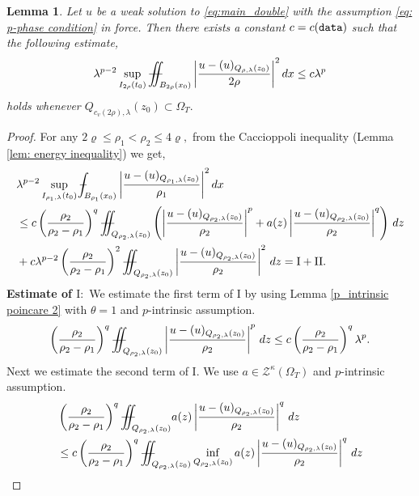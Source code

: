 \documentclass[notitlepage,11pt,reqno]{amsart}
\newtheorem{lemma}[theorem]{Lemma}
\theoremstyle{definition}
\numberwithin{equation}{section}
\newcommand{\la}{\lambda}
\newcommand{\iintss}{{\int\hspace{-0.28cm}\int}}
\newcommand{ \miints }{{\iintss\hspace{-0.56cm} -\hspace{-0.15cm}-}}
\newcommand{\miint}[1]{{\miints_{\hspace{-0.13cm}#1}}}
\def\Xint#1{\mathchoice
	{\XXint\displaystyle\textstyle{#1}}%
	{\XXint\textstyle\scriptstyle{#1}}%
	{\XXint\scriptstyle\scriptscriptstyle{#1}}%
	{\XXint\scriptscriptstyle\scriptscriptstyle{#1}}%
	\!\int}
\def\XXint#1#2#3{{\setbox0=\hbox{$#1{#2#3}{\int}$}
		\vcenter{\hbox{$#2#3$}}\kern-.50\wd0}}
\def\Xint#1{\mathchoice
	{\XXint\displaystyle\textstyle{#1}}%
	{\XXint\textstyle\scriptstyle{#1}}%
	{\XXint\scriptstyle\scriptscriptstyle{#1}}%
	{\XXint\scriptscriptstyle\scriptscriptstyle{#1}}%
	\!\int}
\def\XXint#1#2#3{{\setbox0=\hbox{$#1{#2#3}{\int}$}
		\vcenter{\hbox{$#2#3$}}\kern-.50\wd0}}
\def\dashint{\Xint-}
\begin{document}
\begin{lemma}\label{LEMMA7.5}
Let $u$ be a weak solution to \eqref{eq:main_double} with the assumption \ref{eq: p-phase condition} in force. Then there exists a constant $c=c(\textnormal{\texttt{data}})$ such that the following estimate,
\begin{align*}
\lambda^{p-2} \sup_{I_{2\rho}(t_0)}\miint{B_{2\rho}(x_0)}\left|\frac{u-(u)_{Q_{\rho, \lambda}(z_0)}}{2\rho}\right|^2 dx \leq c \lambda^p
\end{align*}
holds whenever $Q_{c_v(2\rho), \lambda}(z_0)\subset \Omega_T.$
\end{lemma}
\begin{proof}   
For any $2\varrho \leq \rho_1< \rho_2 \leq 4\varrho,$ from the Caccioppoli inequality (Lemma \ref{lem: energy inequality}) we get,
\begin{align*}
    &\la^{p-2}\sup_{I_{\rho_1, \lambda}(t_0)}\dashint_{B_{\rho_1}(x_0)}\left|\frac{u-(u)_{Q_{\rho_1, \lambda}(z_0)}}{\rho_1}\right|^2 dx\nonumber\\
    &\leq c \left(\frac{\rho_2}{\rho_2-\rho_1}\right)^q\miint{Q_{\rho_2, \lambda}(z_0)} \left(\left|\frac{u-(u)_{Q_{\rho_2, \lambda}(z_0)}}{\rho_2}\right|^p + a(z)\left|\frac{u-(u)_{Q_{\rho_2, \lambda}(z_0)}}{\rho_2}\right|^q\right)\, dz\nonumber\\
    &+ c\la^{p-2}\left(\frac{\rho_2}{\rho_2-\rho_1}\right)^2\miint{Q_{\rho_2, \lambda}(z_0)}\left|\frac{u-(u)_{Q_{\rho_2, \lambda}(z_0)}}{\rho_2}\right|^2 \,dz=\mathrm{I}+\mathrm{II}. 
\end{align*}
\textbf{Estimate of $\mathrm{I}:$} We estimate the first term of $\mathrm{I}$ by using Lemma \ref{p_intrinsic poincare 2} with $\theta =1$ and $p$-intrinsic assumption.
\begin{align*}
    \left(\frac{\rho_2}{\rho_2-\rho_1}\right)^q\miint{Q_{\rho_2, \lambda}(z_0)}\left|\frac{u-(u)_{Q_{\rho_2, \lambda}(z_0)}}{\rho_2}\right|^p\, dz \leq c \left(\frac{\rho_2}{\rho_2-\rho_1}\right)^q \lambda^p.
\end{align*}
Next we estimate the second term of $\mathrm{I}.$ We use $a \in \mathcal{Z}^{\kappa}(\Omega_T)$ and $p$-intrinsic assumption.
\begin{align*}
&\left(\frac{\rho_2}{\rho_2-\rho_1}\right)^q \miint{Q_{\rho_2, \lambda}(z_0)} a(z)\left|\frac{u-(u)_{Q_{\rho_2, \lambda}(z_0)}}{\rho_2}\right|^q\, dz\\
&\leq c\left(\frac{\rho_2}{\rho_2-\rho_1}\right)^q \miint{Q_{\rho_2, \lambda}(z_0)} \inf_{Q_{\rho_2, \lambda}(z_0)} a(z) \left|\frac{u-(u)_{Q_{\rho_2, \lambda}(z_0)}}{\rho_2}\right|^q\, dz\\

\end{align*}
\end{proof}
\end{document}
